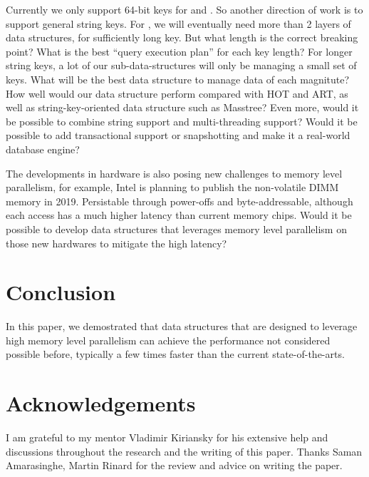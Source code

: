 \documentclass[11pt, usletter]{article}
\begin{document}
Currently we only support 64-bit keys for \MlpPQ and \MlpIndex. 
So another direction of work is to support general string keys. 
For \MlpIndex, we will eventually need more than 2 layers of data structures, 
for sufficiently long key. But what length is the correct breaking point?
What is the best ``query execution plan'' for each key length?
For longer string keys, a lot of our sub-data-structures will only be managing a small set of keys. 
What will be the best data structure to manage data of each magnitute? 
How well would our data structure perform compared with HOT and ART, 
as well as string-key-oriented data structure such as Masstree?
Even more, would it be possible to combine string support and multi-threading support?
Would it be possible to add transactional support or snapshotting and make it a 
real-world database engine? 

The developments in hardware is also posing new challenges to memory level parallelism, 
for example, Intel is planning to publish the non-volatile DIMM memory in 2019.
Persistable through power-offs and byte-addressable, 
although each access has a much higher latency than current memory chips. 
Would it be possible to develop data structures that leverages memory level parallelism 
on those new hardwares to mitigate the high latency? 

\section{Conclusion} \label{conclusion}

In this paper, we demostrated that data structures that are designed to leverage high memory level parallelism 
can achieve the performance not considered possible before, 
typically a few times faster than the current state-of-the-arts. 

\section*{Acknowledgements}

I am grateful to my mentor Vladimir Kiriansky for his extensive help and discussions throughout the research 
and the writing of this paper. Thanks Saman Amarasinghe, Martin Rinard for the review and advice on writing the paper. 

{}

\end{document}
